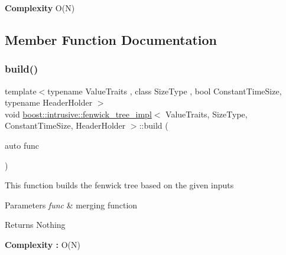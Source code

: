 {\bfseries  Complexity } O(\+N) 

\subsection{Member Function Documentation}
\mbox{\label{classboost_1_1intrusive_1_1fenwick__tree__impl_a77c1686e0488c841133aefcf7992b29c}} 
\subsubsection{\texorpdfstring{build()}{build()}}
{\footnotesize\ttfamily template$<$typename Value\+Traits , class Size\+Type , bool Constant\+Time\+Size, typename Header\+Holder $>$ \\
void \hyperlink{classboost_1_1intrusive_1_1fenwick__tree__impl}{boost\+::intrusive\+::fenwick\+\_\+tree\+\_\+impl}$<$ Value\+Traits, Size\+Type, Constant\+Time\+Size, Header\+Holder $>$\+::build (\begin{DoxyParamCaption}\item[{auto}]{func }\end{DoxyParamCaption})\hspace{0.3cm}{\ttfamily [inline]}}

This function builds the fenwick tree based on the given inputs 
\begin{DoxyParams}{Parameters}
{\em func} & merging function \\
\hline
\end{DoxyParams}
\begin{DoxyReturn}{Returns}
Nothing 
\end{DoxyReturn}


{\bfseries Complexity \+: } O(\+N) \mbox{\label{classboost_1_1intrusive_1_1fenwick__tree__impl_a47f1c138ed862fc41b178ca30478e0f9}} 
